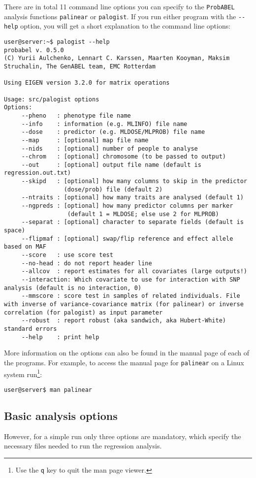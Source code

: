 \documentclass[12pt,a4paper]{article}
\newcommand{\PA}{\texttt{ProbABEL}}
\begin{document}
There are in total 11 command line options you can specify to the
\PA{} analysis functions \texttt{palinear} or \texttt{palogist}. If
you run either program with the \lstinline{--help} option, you will get a
short explanation to the command line options:
\begin{lstlisting}[basicstyle=\scriptsize\ttfamily]
user@server:~$ palogist --help
probabel v. 0.5.0
(C) Yurii Aulchenko, Lennart C. Karssen, Maarten Kooyman, Maksim Struchalin, The GenABEL team, EMC Rotterdam

Using EIGEN version 3.2.0 for matrix operations

Usage: src/palogist options
Options:
	 --pheno   : phenotype file name
	 --info    : information (e.g. MLINFO) file name
	 --dose    : predictor (e.g. MLDOSE/MLPROB) file name
	 --map     : [optional] map file name
	 --nids    : [optional] number of people to analyse
	 --chrom   : [optional] chromosome (to be passed to output)
	 --out     : [optional] output file name (default is regression.out.txt)
	 --skipd   : [optional] how many columns to skip in the predictor
	             (dose/prob) file (default 2)
	 --ntraits : [optional] how many traits are analysed (default 1)
	 --ngpreds : [optional] how many predictor columns per marker
	              (default 1 = MLDOSE; else use 2 for MLPROB)
	 --separat : [optional] character to separate fields (default is space)
	 --flipmaf : [optional] swap/flip reference and effect allele based on MAF
	 --score   : use score test
	 --no-head : do not report header line
	 --allcov  : report estimates for all covariates (large outputs!)
	 --interaction: Which covariate to use for interaction with SNP analysis (default is no interaction, 0)
	 --mmscore : score test in samples of related individuals. File with inverse of variance-covariance matrix (for palinear) or inverse correlation (for palogist) as input parameter
	 --robust  : report robust (aka sandwich, aka Hubert-White) standard errors
	 --help    : print help
\end{lstlisting}
More information on the options can also be found in the manual page
of each of the programs. For example, to access the manual page for
\texttt{palinear} on a Linux system run\footnote{Use the \texttt{q}
  key to quit the man page viewer.}:
\begin{lstlisting}
user@server$ man palinear
\end{lstlisting}


\subsection{Basic analysis options}
However, for a simple run only three options are mandatory, which
specify the necessary files needed to run the regression analysis.
\end{document}

